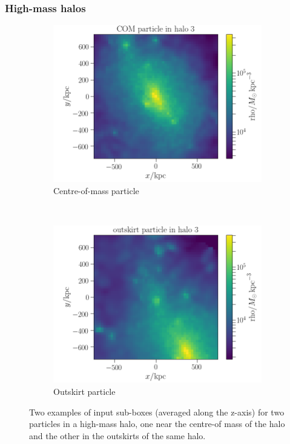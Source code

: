 \documentclass[11pt]{article}
\begin{document}
\subsubsection{High-mass halos}
\begin{figure}
    \centering
    \begin{subfigure}{0.5\textwidth}
        \centering
        \includegraphics[width=\textwidth]{z0/input_data_COM_particle_halo3}
        \caption{Centre-of-mass particle}
    \end{subfigure}%
    ~ 
    \begin{subfigure}{0.5\textwidth}
        \centering
        \includegraphics[width=\textwidth]{z0/input_data_outskirt_particle_halo3}
        \caption{Outskirt particle}
    \end{subfigure}
    \caption{Two examples of input sub-boxes (averaged along the z-axis) for two particles in a high-mass halo, one near the centre-of mass of the halo and the other in the outskirts of the same halo.}
    \label{input_halo3}
\end{figure}
\end{document}
